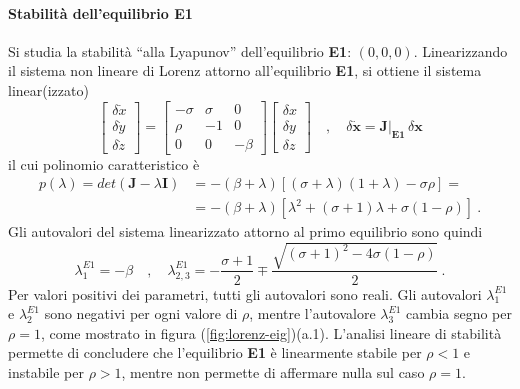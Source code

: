 \paragraph{Stabilità dell'equilibrio E1}
Si studia la stabilità ``alla Lyapunov'' dell'equilibrio \textbf{E1}: $(0,0,0)$. Linearizzando
 il sistema non lineare di Lorenz attorno all'equilibrio \textbf{E1}, si ottiene il sistema
 linear(izzato)
\begin{equation}
 \begin{bmatrix} \delta \dot{x} \\ \delta \dot{y} \\ \delta \dot{z} \end{bmatrix} = 
 \begin{bmatrix}-\sigma & \sigma & 0 \\ \rho & -1 & 0 \\ 0 & 0 & - \beta \end{bmatrix}  
 \begin{bmatrix} \delta x \\ \delta y \\ \delta z \end{bmatrix} \quad , \quad
 \delta \dot{\bm{x}} = \bm{J}|_{\bm{E1}} \, \delta \bm{x}
\end{equation}
il cui polinomio caratteristico è
\begin{equation}
\begin{aligned}
 p(\lambda) = det(\bm{J}- \lambda \bm{I}) & = -(\beta+\lambda)[(\sigma+\lambda)(1+\lambda)-\sigma\rho] = \\ 
  & = -(\beta+\lambda) [ \lambda^2 + (\sigma+1)\lambda + \sigma(1-\rho)] \ . 
\end{aligned}
\end{equation}
Gli autovalori del sistema linearizzato attorno al primo equilibrio sono quindi
\begin{equation}
  \lambda^{E1}_1 = - \beta \quad , \quad  
  \lambda^{E1}_{2,3} = - \dfrac{\sigma+1}{2} \mp \dfrac{\sqrt{(\sigma+1)^2-4\sigma(1-\rho)}}{2} \ . 
\end{equation}
Per valori positivi dei parametri, tutti gli autovalori sono reali. Gli autovalori $\lambda^{E1}_1$
 e $\lambda^{E1}_2$ sono negativi per ogni valore di $\rho$, mentre l'autovalore $\lambda^{E1}_3$
 cambia segno per $\rho = 1$, come mostrato in figura (\ref{fig:lorenz-eig})(a.1). L'analisi lineare di stabilità permette di concludere che l'equilibrio
 \textbf{E1} è linearmente stabile per $\rho<1$ e instabile per $\rho > 1$, mentre non
 permette di affermare nulla sul caso $\rho = 1$.
